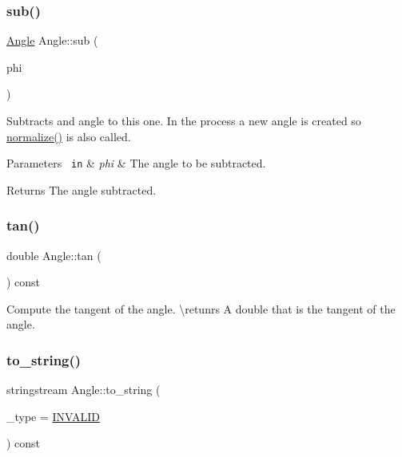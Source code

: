 \mbox{\label{class_angle_a74797d883c7a00259f49a9e5dea01c0d}} 
\subsubsection{\texorpdfstring{sub()}{sub()}}
{\footnotesize\ttfamily \mbox{\hyperlink{class_angle}{Angle}} Angle\+::sub (\begin{DoxyParamCaption}\item[{const \mbox{\hyperlink{class_angle}{Angle}}}]{phi }\end{DoxyParamCaption})\hspace{0.3cm}{\ttfamily [inline]}}



Subtracts and angle to this one. In the process a new angle is created so {\ttfamily \mbox{\hyperlink{class_angle_a449fc0638ca2e26b4a57d1cce95788e8}{normalize()}}} is also called. 


\begin{DoxyParams}[1]{Parameters}
\mbox{\texttt{ in}}  & {\em phi} & The angle to be subtracted. \\
\hline
\end{DoxyParams}
\begin{DoxyReturn}{Returns}
The angle subtracted. 
\end{DoxyReturn}
\mbox{\label{class_angle_a2b1f249db1c3a2b741c2834b2d04d60a}} 
\subsubsection{\texorpdfstring{tan()}{tan()}}
{\footnotesize\ttfamily double Angle\+::tan (\begin{DoxyParamCaption}{ }\end{DoxyParamCaption}) const\hspace{0.3cm}{\ttfamily [inline]}}



Compute the tangent of the angle. \textbackslash{}retunrs A {\ttfamily double} that is the tangent of the angle. 

\mbox{\label{class_angle_a5022b65b8a46e4050cde8a27cdc8d236}} 
\subsubsection{\texorpdfstring{to\_string()}{to\_string()}}
{\footnotesize\ttfamily stringstream Angle\+::to\+\_\+string (\begin{DoxyParamCaption}\item[{\mbox{\hyperlink{class_angle_a4f7b9849ce8780bcba95ca3ee45cff77}{A\+N\+G\+L\+E\+\_\+\+T\+Y\+PE}}}]{\+\_\+type = {\ttfamily \mbox{\hyperlink{class_angle_a4f7b9849ce8780bcba95ca3ee45cff77aa3c85e092f5da4bb998d0ddc6632dcbf}{I\+N\+V\+A\+L\+ID}}} }\end{DoxyParamCaption}) const\hspace{0.3cm}{\ttfamily [inline]}}

